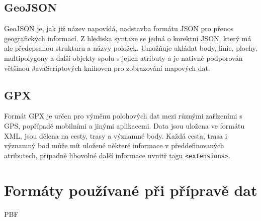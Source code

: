 \subsection{GeoJSON}
GeoJSON\cite{GeoJSON} je, jak již název napovídá, nadstavba formátu JSON pro přenos
geografických informací. Z hlediska syntaxe se jedná o korektní JSON, který má
ale předepsanou strukturu a názvy položek. Umožňuje ukládat body, linie, plochy,
multipolygony a další objekty spolu s jejich atributy a je nativně podporován
většinou JavaScriptových knihoven pro zobrazování mapových dat.

\subsection{GPX}
Formát GPX\cite{GPX} je určen pro výměnu polohových dat mezi různými zařízeními s GPS,
popřípadě mobilními a jinými aplikacemi. Data jsou uložena ve formátu XML, jsou
dělena na cesty, trasy a významné body. Každá cesta, trasa i významný bod může
mít uložené některé informace v předdefinovaných atributech, případně libovolné
další informace uvnitř tagu {\tt <extensions>}. 

\section{Formáty používané při přípravě dat}
\label{ch:formaty-dat:priprava}
\TODO PBF
